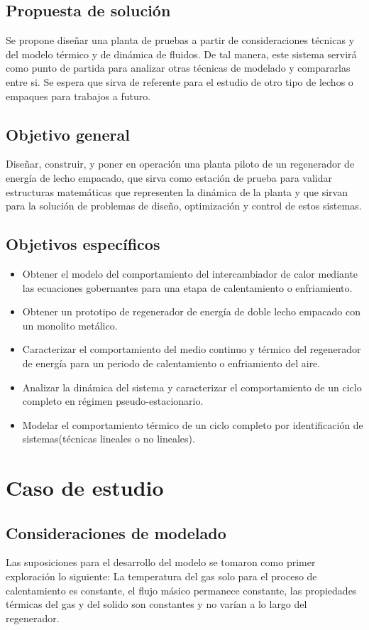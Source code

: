 \documentclass[12pt,letterpaper,final]{article}%
\begin{document}
\subsection{Propuesta de soluci\'on} 
Se propone dise\~nar una planta de pruebas a partir de consideraciones t\'ecnicas y del modelo t\'ermico y de din\'amica de fluidos. De tal manera, este sistema servir\'a como punto de partida para analizar otras t\'ecnicas de modelado y compararlas entre si. Se espera que sirva de referente para el estudio de otro tipo de lechos o empaques para trabajos a futuro.
\subsection{Objetivo general}
Diseñar, construir, y poner en operaci\'on una planta piloto de un regenerador de energ\'ia de lecho empacado, que sirva como estaci\'on de prueba para validar estructuras matem\'aticas que representen la din\'amica de la
planta y que sirvan para la soluci\'on de problemas de diseño, optimizaci\'on y control de estos sistemas.
\subsection{Objetivos espec\'ificos}
\begin{itemize}
	\item Obtener el modelo del comportamiento del intercambiador de calor mediante las ecuaciones gobernantes para una etapa de calentamiento o enfriamiento.
	\item Obtener un prototipo  de regenerador de energía de doble lecho empacado con un monolito metálico.
	\item Caracterizar el comportamiento del medio continuo y térmico del regenerador de energía para un periodo de calentamiento o enfriamiento del aire.
	\item Analizar la dinámica del sistema y caracterizar el comportamiento de un ciclo completo en régimen pseudo-estacionario.
	\item Modelar el comportamiento térmico de un ciclo completo por identificación de sistemas(técnicas lineales o no lineales).
	
\end{itemize}
\newpage
\section{Caso de estudio}
\subsection{Consideraciones de modelado }
Las suposiciones para el desarrollo del modelo se tomaron como primer exploración lo siguiente: La temperatura del gas solo para el proceso de calentamiento es constante, el flujo másico permanece constante, las propiedades térmicas del gas y del solido son constantes y no varían a lo largo del regenerador.
\end{document}
